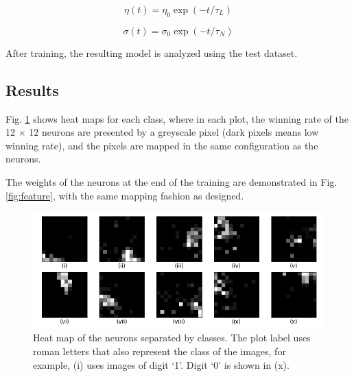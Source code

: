 \documentclass[11pt,titlepage]{article}
\begin{document}
\begin{equation}
	\eta (t) = \eta_0 \exp(-t/\tau_L)
	\label{eqn:eta}
\end{equation} 

\begin{equation}
	\sigma(t) = \sigma_0 \exp (-t / \tau_N)
	\label{eqn:sigma}
\end{equation}

After training, the resulting model is analyzed using the test dataset. 












\subsection{Results}
Fig. \ref{fig:heatmap} shows heat maps for each class, where in each plot, the winning rate of the 12 $\times$ 12 neurons are presented by a greyscale pixel (dark pixels means low winning rate), and the pixels are mapped in the same configuration as the neurons. 

The weights of the neurons at the end of the training are demonstrated in Fig. \ref{fig:feature}, with the same mapping fashion as designed. 

\begin{figure}[H]
	\centering
	\includegraphics[width=\linewidth]{img/h5p1_heat}
	\caption{Heat map of the neurons separated by classes. The plot label uses roman letters that also represent the class of the images, for example, (i) uses images of digit `1'. Digit `0' is shown in (x).}
	\label{fig:heatmap}
\end{figure}
\end{document}
